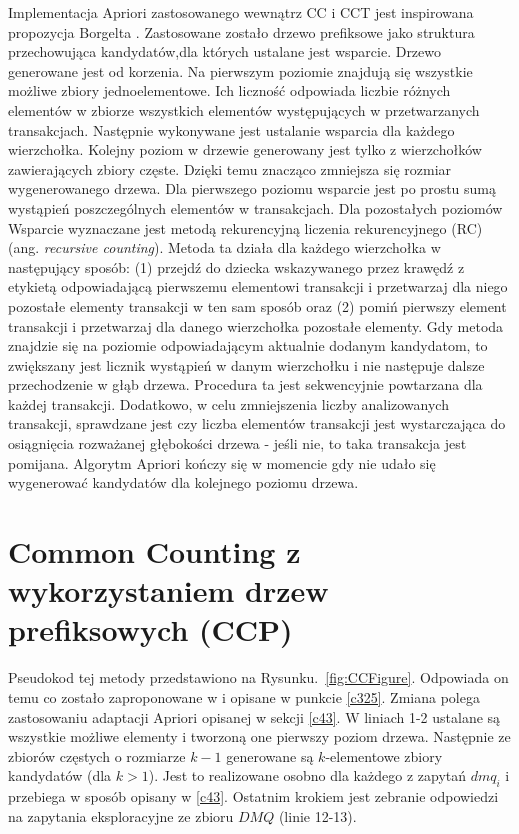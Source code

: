 Implementacja Apriori zastosowanego wewnątrz CC i CCT jest inspirowana propozycja Borgelta \cite{Borgelt}. Zastosowane zostało drzewo prefiksowe jako struktura przechowująca kandydatów,dla których ustalane jest wsparcie. Drzewo generowane jest od korzenia. Na pierwszym poziomie znajdują się wszystkie możliwe zbiory jednoelementowe. Ich liczność odpowiada liczbie różnych elementów w zbiorze wszystkich elementów występujących w przetwarzanych transakcjach. Następnie wykonywane jest ustalanie wsparcia dla każdego wierzchołka. Kolejny poziom w drzewie generowany jest tylko z wierzchołków zawierających zbiory częste. Dzięki temu znacząco zmniejsza się rozmiar wygenerowanego drzewa. Dla pierwszego poziomu wsparcie jest po prostu sumą wystąpień poszczególnych elementów w transakcjach. Dla pozostałych poziomów Wsparcie wyznaczane jest metodą rekurencyjną liczenia rekurencyjnego (RC) (ang. \textit{recursive counting}). Metoda ta działa dla każdego wierzchołka w następujący sposób: (1) przejdź do dziecka wskazywanego przez krawędź z etykietą odpowiadającą pierwszemu elementowi transakcji i przetwarzaj dla niego pozostałe elementy transakcji w ten sam sposób oraz (2) pomiń pierwszy element transakcji i przetwarzaj dla danego wierzchołka pozostałe elementy. Gdy metoda znajdzie się na poziomie odpowiadającym aktualnie dodanym kandydatom, to zwiększany jest licznik wystąpień w danym wierzchołku i nie następuje dalsze przechodzenie w głąb drzewa. Procedura ta jest sekwencyjnie powtarzana dla każdej transakcji. Dodatkowo, w celu zmniejszenia liczby analizowanych transakcji, sprawdzane jest czy liczba elementów transakcji jest wystarczająca do osiągnięcia rozważanej głębokości drzewa - jeśli nie, to taka transakcja jest pomijana. Algorytm Apriori kończy się w momencie gdy nie udało się wygenerować kandydatów dla kolejnego poziomu drzewa.

\section{Common Counting z wykorzystaniem drzew prefiksowych (CCP)}
\label{c44}
Pseudokod tej metody przedstawiono na Rysunku.~\ref{fig:CCFigure}. Odpowiada on temu co zostało zaproponowane w \cite{WojciechowskiCC} i opisane w punkcie \ref{c325}. Zmiana polega zastosowaniu adaptacji Apriori opisanej w sekcji \ref{c43}. W liniach 1-2 ustalane są wszystkie możliwe elementy i tworzoną one pierwszy poziom drzewa. Następnie ze zbiorów częstych o rozmiarze \(k-1\) generowane są \(k\)-elementowe zbiory kandydatów (dla \(k > 1\)). Jest to realizowane osobno dla każdego z zapytań \(dmq_i\) i przebiega w sposób opisany w \ref{c43}. Ostatnim krokiem jest zebranie odpowiedzi na zapytania eksploracyjne ze zbioru \(DMQ\) (linie 12-13).


